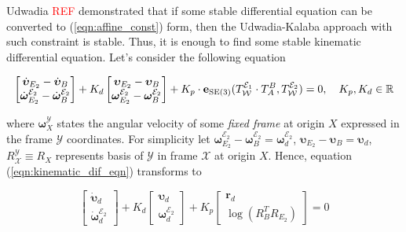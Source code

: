 Udwadia \textcolor{red}{REF} demonstrated that if some stable differential 
equation can be converted to (\ref{eqn:affine_const}) form, then the Udwadia-Kalaba 
approach with such constraint is stable. Thus, it is enough to find some stable 
kinematic differential equation. Let's consider the following equation 

\begin{equation}
    \begin{bmatrix}
        \dot{\boldsymbol{\upsilon}}_{E_2} - \dot{\boldsymbol{\upsilon}}_B \\
        \dot{\boldsymbol{\omega}}_{E_2}^{\mathcal{E}_2} - 
        \dot{\boldsymbol{\omega}}_B^{\mathcal{E}_2}
    \end{bmatrix} 
    + K_d 
    \begin{bmatrix}
        \boldsymbol{\upsilon}_{E_2} - \boldsymbol{\upsilon}_B \\
        \boldsymbol{\omega}_{E_2}^{\mathcal{E}_2} - 
        \boldsymbol{\omega}_B^{\mathcal{E}_2}
    \end{bmatrix}
    + K_p \cdot
    \mathbf{e}_{\text{SE}(3)}(
        T_{\mathcal{W}}^{\mathcal{E}_1} \cdot
        T_{A}^{B},
        T_{\mathcal{W}}^{\mathcal{E}_2}
    ) = 0, \quad 
    K_p, K_d \in \mathbb{R}
    \label{eqn:kinematic_dif_eqn}
\end{equation}

where $\boldsymbol{\omega}_X^{\mathcal{Y}}$ states the angular velocity of some 
\emph{fixed frame} at origin $X$ expressed in the frame $\mathcal{Y}$ coordinates.  
For simplicity let $\boldsymbol{\omega}_{E_2}^{\mathcal{E}_2} - 
\boldsymbol{\omega}_B^{\mathcal{E}_2} = \boldsymbol{\omega}_d^{\mathcal{E}_2}$, 
$\boldsymbol{\upsilon}_{E_2} - \boldsymbol{\upsilon}_B = \boldsymbol{\upsilon}_d$, 
$R_{\mathcal{X}}^{\mathcal{Y}} \equiv R_X$ represents basis of $\mathcal{Y}$ in 
frame $\mathcal{X}$ at origin $X$. Hence, equation (\ref{eqn:kinematic_dif_eqn}) 
transforms to 

\begin{equation}
    \begin{bmatrix}
        \dot{\boldsymbol{\upsilon}}_d \\
        \dot{\boldsymbol{\omega}}_d^{\mathcal{E}_2}
    \end{bmatrix}
    + K_d
    \begin{bmatrix}
        \boldsymbol{\upsilon}_d \\
        \boldsymbol{\omega}_d^{\mathcal{E}_2}
    \end{bmatrix}
    + K_p
    \begin{bmatrix}
        \mathbf{r}_d \\
        \log (R_B^T R_{E_2})
    \end{bmatrix}
    = 0
    \label{eqn:kinematic_dif_eqn_simple}
\end{equation}


